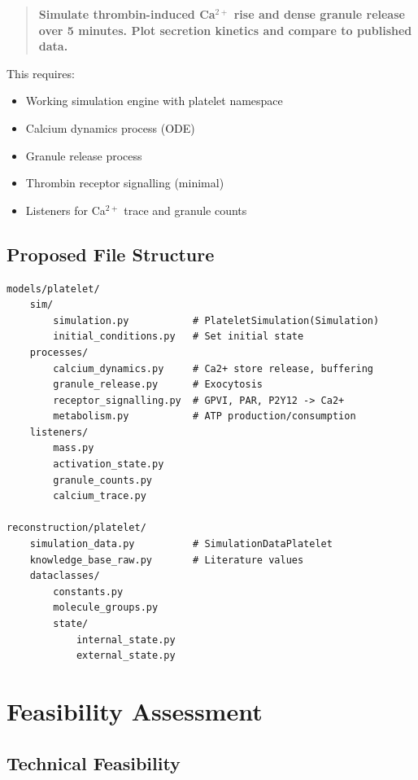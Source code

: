 \documentclass[11pt,a4paper]{report}
\begin{document}
\begin{quote}
\textbf{Simulate thrombin-induced Ca$^{2+}$ rise and dense granule release over 5 minutes. Plot secretion kinetics and compare to published data.}
\end{quote}

This requires:
\begin{itemize}
    \item Working simulation engine with platelet namespace
    \item Calcium dynamics process (ODE)
    \item Granule release process
    \item Thrombin receptor signalling (minimal)
    \item Listeners for Ca$^{2+}$ trace and granule counts
\end{itemize}

\section{Proposed File Structure}

\begin{lstlisting}
models/platelet/
    sim/
        simulation.py           # PlateletSimulation(Simulation)
        initial_conditions.py   # Set initial state
    processes/
        calcium_dynamics.py     # Ca2+ store release, buffering
        granule_release.py      # Exocytosis
        receptor_signalling.py  # GPVI, PAR, P2Y12 -> Ca2+
        metabolism.py           # ATP production/consumption
    listeners/
        mass.py
        activation_state.py
        granule_counts.py
        calcium_trace.py

reconstruction/platelet/
    simulation_data.py          # SimulationDataPlatelet
    knowledge_base_raw.py       # Literature values
    dataclasses/
        constants.py
        molecule_groups.py
        state/
            internal_state.py
            external_state.py
\end{lstlisting}

\chapter{Feasibility Assessment}

\section{Technical Feasibility}
\end{document}
